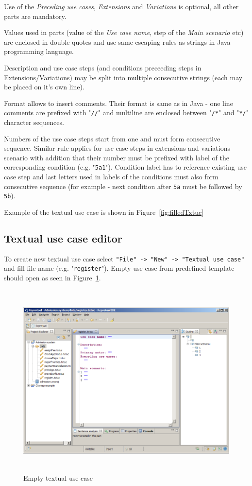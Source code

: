 Use of the \textit{Preceding use cases}, \textit{Extensions} and \textit{Variations} is optional, all other parts are mandatory.

Values used in parts (value of the \textit{Use case name}, step of the \textit{Main scenario} etc) are enclosed in double quotes and use same escaping rules as strings in Java programming language.

Description and use case steps (and conditions preceeding steps in Extensions/Variations) may be split into multiple consecutive strings (each may be placed on it's own line).

Format allows to insert comments. Their format is same as in Java - one line comments are prefixed with "\verb|//|" and multiline are enclosed between "\verb|/*|" and "\verb|*/|" character sequences.

Numbers of the use case steps start from one and must form consecutive sequence. Similar rule applies for use case steps in extensions and variations scenario with addition that their number must be prefixed with label of the corresponding condition (e.g. "\verb|5a1|"). Condition label has to reference existing use case step and last  letters used in labels of the conditions must also form consecutive sequence (for example - next condition after \verb|5a| must be followed by \verb|5b|).

Example of the textual use case is shown in Figure~\ref{fig:filledTxtuc}


\subsection{Textual use case editor}

To create new textual use case select \verb|"File" -> "New" -> "Textual use case"| and fill file name (e.g. "\verb|register|"). Empty use case from predefined template should open as seen in Figure~\ref{fig:emptyTxtuc}.

\begin{figure}[ht]
  \centering
  \includegraphics[height=280pt]{images/txtuc-editor/emptyTxtuc}
  \caption{Empty textual use case}
  \label{fig:emptyTxtuc}
\end{figure}

